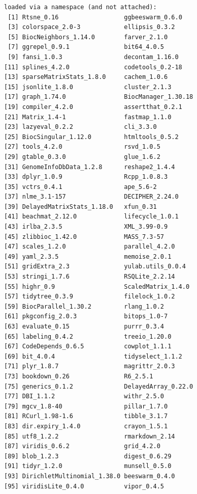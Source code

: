 \documentclass[
]{book}
\begin{document}
\begin{verbatim}
loaded via a namespace (and not attached):
 [1] Rtsne_0.16                  ggbeeswarm_0.6.0           
 [3] colorspace_2.0-3            ellipsis_0.3.2             
 [5] BiocNeighbors_1.14.0        farver_2.1.0               
 [7] ggrepel_0.9.1               bit64_4.0.5                
 [9] fansi_1.0.3                 decontam_1.16.0            
[11] splines_4.2.0               codetools_0.2-18           
[13] sparseMatrixStats_1.8.0     cachem_1.0.6               
[15] jsonlite_1.8.0              cluster_2.1.3              
[17] graph_1.74.0                BiocManager_1.30.18        
[19] compiler_4.2.0              assertthat_0.2.1           
[21] Matrix_1.4-1                fastmap_1.1.0              
[23] lazyeval_0.2.2              cli_3.3.0                  
[25] BiocSingular_1.12.0         htmltools_0.5.2            
[27] tools_4.2.0                 rsvd_1.0.5                 
[29] gtable_0.3.0                glue_1.6.2                 
[31] GenomeInfoDbData_1.2.8      reshape2_1.4.4             
[33] dplyr_1.0.9                 Rcpp_1.0.8.3               
[35] vctrs_0.4.1                 ape_5.6-2                  
[37] nlme_3.1-157                DECIPHER_2.24.0            
[39] DelayedMatrixStats_1.18.0   xfun_0.31                  
[41] beachmat_2.12.0             lifecycle_1.0.1            
[43] irlba_2.3.5                 XML_3.99-0.9               
[45] zlibbioc_1.42.0             MASS_7.3-57                
[47] scales_1.2.0                parallel_4.2.0             
[49] yaml_2.3.5                  memoise_2.0.1              
[51] gridExtra_2.3               yulab.utils_0.0.4          
[53] stringi_1.7.6               RSQLite_2.2.14             
[55] highr_0.9                   ScaledMatrix_1.4.0         
[57] tidytree_0.3.9              filelock_1.0.2             
[59] BiocParallel_1.30.2         rlang_1.0.2                
[61] pkgconfig_2.0.3             bitops_1.0-7               
[63] evaluate_0.15               purrr_0.3.4                
[65] labeling_0.4.2              treeio_1.20.0              
[67] CodeDepends_0.6.5           cowplot_1.1.1              
[69] bit_4.0.4                   tidyselect_1.1.2           
[71] plyr_1.8.7                  magrittr_2.0.3             
[73] bookdown_0.26               R6_2.5.1                   
[75] generics_0.1.2              DelayedArray_0.22.0        
[77] DBI_1.1.2                   withr_2.5.0                
[79] mgcv_1.8-40                 pillar_1.7.0               
[81] RCurl_1.98-1.6              tibble_3.1.7               
[83] dir.expiry_1.4.0            crayon_1.5.1               
[85] utf8_1.2.2                  rmarkdown_2.14             
[87] viridis_0.6.2               grid_4.2.0                 
[89] blob_1.2.3                  digest_0.6.29              
[91] tidyr_1.2.0                 munsell_0.5.0              
[93] DirichletMultinomial_1.38.0 beeswarm_0.4.0             
[95] viridisLite_0.4.0           vipor_0.4.5                
\end{verbatim}
\end{document}
